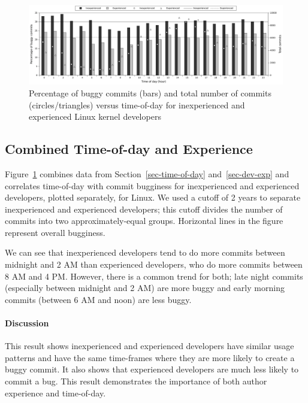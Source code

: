 \begin{figure}[tbh]
\includegraphics[width=\textwidth]{linux-bugginess-hour-experienced.pdf}
\caption{\label{fig-linux-bugginess-experienced}Percentage of buggy commits
 (bars) and total number of commits (circles/triangles) versus time-of-day for
 inexperienced and experienced Linux kernel developers}
\end{figure}

\subsection{Combined Time-of-day and Experience}
\label{sec:toddev-exp}

Figure~\ref{fig-linux-bugginess-experienced} combines data from
Section~\ref{sec-time-of-day} and~\ref{sec-dev-exp} and correlates time-of-day
with commit bugginess for inexperienced and experienced developers,
plotted separately, for Linux. We used
a cutoff of 2 years to separate inexperienced and experienced developers; 
this cutoff divides the number of commits into two approximately-equal groups. 
Horizontal lines in the figure represent overall
bugginess. 

We can see that inexperienced developers tend to do more commits between
midnight and 2 AM than experienced developers, who do more commits between 8 AM
and 4 PM. However, there is a common trend for both; late night commits
(especially between midnight and 2 AM) are more buggy and early morning commits
(between 6 AM and noon) are less buggy.

\paragraph{Discussion}

This result shows inexperienced and experienced developers have similar usage
patterns and have the same time-frames where they are more likely to create a
buggy commit. It also shows that experienced developers are much less likely to
commit a bug. This result demonstrates the importance of both author experience
and time-of-day.

